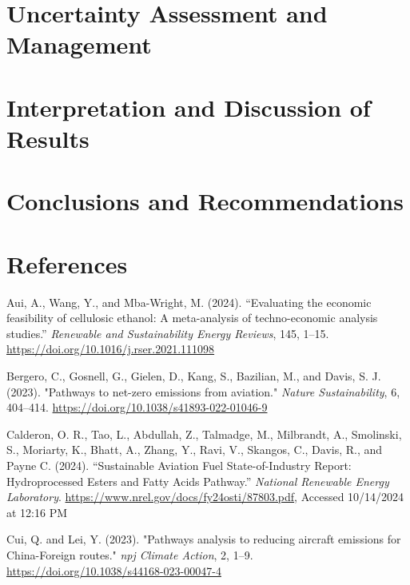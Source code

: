 \documentclass[12pt]{article}
\begin{document}
\begin{Appendix}
\section{Uncertainty Assessment and Management}

\section{Interpretation and Discussion of Results}

\section{Conclusions and Recommendations}

\section{References}

\begin{description}
    \setlength{\itemsep}{0pt} %
    \small %

    \item Aui, A., Wang, Y., and Mba-Wright, M. (2024). “Evaluating the economic feasibility of cellulosic ethanol: A meta-analysis of techno-economic analysis studies.” \textit{Renewable and Sustainability Energy Reviews}, 145, 1–15. \url{https://doi.org/10.1016/j.rser.2021.111098}
    
    \item Bergero, C., Gosnell, G., Gielen, D., Kang, S., Bazilian, M., and Davis, S. J. (2023). "Pathways to net-zero emissions from aviation." \textit{Nature Sustainability}, 6, 404–414. \url{https://doi.org/10.1038/s41893-022-01046-9}
    
    \item Calderon, O. R., Tao, L., Abdullah, Z., Talmadge, M., Milbrandt, A., Smolinski, S., Moriarty, K., Bhatt, A., Zhang, Y., Ravi, V., Skangos, C., Davis, R., and Payne C. (2024). “Sustainable Aviation Fuel State-of-Industry Report: Hydroprocessed Esters and Fatty Acids Pathway.” \textit{National Renewable Energy Laboratory}. \url{https://www.nrel.gov/docs/fy24osti/87803.pdf}, Accessed 10/14/2024 at 12:16 PM
    
    \item Cui, Q. and Lei, Y. (2023). "Pathways analysis to reducing aircraft emissions for China-Foreign routes." \textit{npj Climate Action}, 2, 1–9. \url{https://doi.org/10.1038/s44168-023-00047-4}
    

\end{description}
\end{Appendix}
\end{document}
